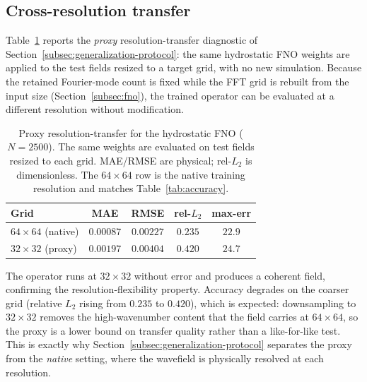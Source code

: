 \subsection{Cross-resolution transfer}
\label{subsec:res-crossres}
Table~\ref{tab:crossres} reports the \emph{proxy} resolution-transfer diagnostic of Section~\ref{subsec:generalization-protocol}: the same hydrostatic FNO weights are applied to the test fields resized to a target grid, with no new simulation. Because the retained Fourier-mode count is fixed while the FFT grid is rebuilt from the input size (Section~\ref{subsec:fno}), the trained operator can be evaluated at a different resolution without modification.

\begin{table}[!htbp]
\centering
\caption{Proxy resolution-transfer for the hydrostatic FNO ($N=2500$). The same weights are evaluated on test fields resized to each grid. MAE/RMSE are physical; rel-$L_2$ is dimensionless. The $64\times64$ row is the native training resolution and matches Table~\ref{tab:accuracy}.}
\label{tab:crossres}
\begin{tabular}{lcccc}
    \toprule
    Grid & MAE & RMSE & rel-$L_2$ & max-err \\
    \midrule
    $64\times64$ (native) & $0.00087$ & $0.00227$ & $0.235$ & $22.9$ \\
    $32\times32$ (proxy)  & $0.00197$ & $0.00404$ & $0.420$ & $24.7$ \\
    \bottomrule
\end{tabular}
\end{table}

The operator runs at $32\times32$ without error and produces a coherent field, confirming the resolution-flexibility property. Accuracy degrades on the coarser grid (relative $L_2$ rising from $0.235$ to $0.420$), which is expected: downsampling to $32\times32$ removes the high-wavenumber content that the field carries at $64\times64$, so the proxy is a lower bound on transfer quality rather than a like-for-like test. This is exactly why Section~\ref{subsec:generalization-protocol} separates the proxy from the \emph{native} setting, where the wavefield is physically resolved at each resolution.

